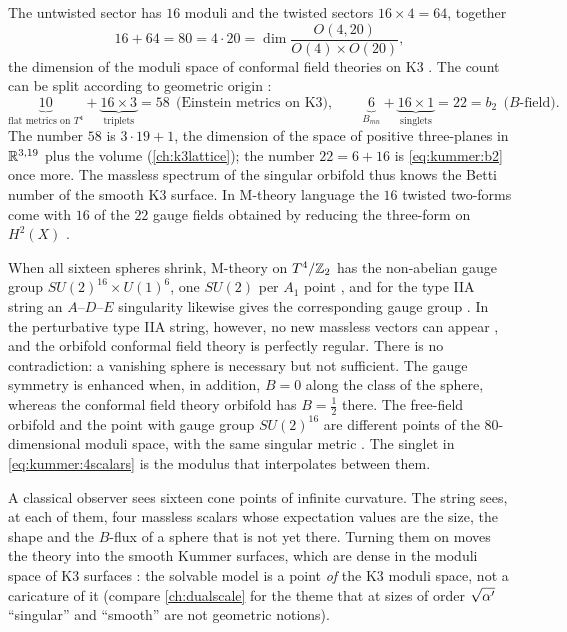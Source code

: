 \begin{example}[$80=16+64$, and two refinements]\label{ex:kummer:80}
The untwisted sector has $16$ moduli and the twisted sectors $16\times4=64$, together
\[
  16+64=80=4\cdot20=\dim\frac{O(4,20)}{O(4)\times O(20)} ,
\]
the dimension of the moduli space of conformal field theories on K3
. The count can be split according to geometric origin
:
\[
 \underbrace{10}_{\text{flat metrics on }T^4}+\underbrace{16\times3}_{\text{triplets}}=58
 \ \ \text{(Einstein metrics on K3)},\qquad
 \underbrace{6}_{B_{mn}}+\underbrace{16\times1}_{\text{singlets}}=22=b_2\ \ \text{($B$-field)}.
\]
The number $58$ is $3\cdot19+1$, the dimension of the space of positive three-planes in
$\mathbb{R}^{3,19}$ plus the volume (\cref{ch:k3lattice}); the number $22=6+16$ is
\eqref{eq:kummer:b2} once more. The massless spectrum of the singular orbifold thus knows the
Betti number of the smooth K3 surface. In M-theory language the $16$ twisted two-forms
come with $16$ of the $22$ gauge fields obtained by reducing the three-form on $H^2(X)$
.
\end{example}

\begin{pitfallbox}
When all sixteen spheres shrink, M-theory on $T^4/\mathbb{Z}_2$ has the non-abelian gauge group
$SU(2)^{16}\times U(1)^6$, one $SU(2)$ per $A_1$ point , and for the
type IIA string an $A$--$D$--$E$ singularity likewise gives the corresponding gauge group
. In the perturbative type IIA string, however, no new
massless vectors can appear , and the orbifold conformal field
theory is perfectly regular. There is no contradiction: a vanishing sphere is necessary but
not sufficient. The gauge symmetry is enhanced when, in addition, $B=0$ along the class of
the sphere, whereas the conformal field theory orbifold has $B=\frac12$ there. The
free-field orbifold and the point with gauge group $SU(2)^{16}$ are different points of the
$80$-dimensional moduli space, with the same singular metric \TL{}
. The singlet in \eqref{eq:kummer:4scalars} is the modulus that
interpolates between them.
\end{pitfallbox}

A classical observer sees sixteen cone points of infinite curvature. The string sees, at
each of them, four massless scalars whose expectation values are the size, the shape and the
$B$-flux of a sphere that is not yet there. Turning them on moves the theory into the smooth
Kummer surfaces, which are dense in the moduli space of K3 surfaces
: the solvable model is a point \emph{of} the K3 moduli space, not
a caricature of it (compare \cref{ch:dualscale} for the theme that at sizes of order
$\sqrt{\alpha'}$ ``singular'' and ``smooth'' are not geometric notions).

